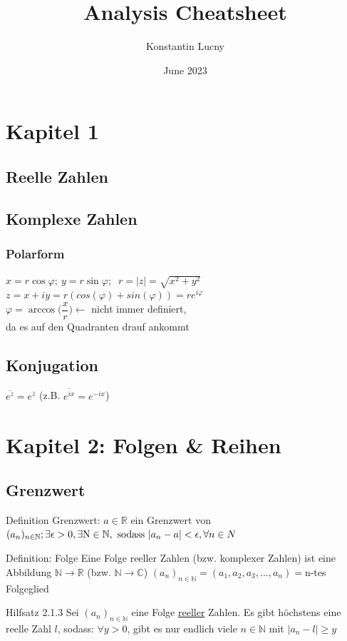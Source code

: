\documentclass[a4paper,10pt]{article}
\title{Analysis Cheatsheet}
\author{Konstantin Lucny}
\date{June 2023}
\def\R{\mathbb{R}}
\begin{document}
\maketitle



\section{Kapitel 1}
\subsection{Reelle Zahlen}

\subsection{Komplexe Zahlen}
\subsubsection{Polarform}
$ x = r\cos {\varphi};\ y=r\sin{\varphi};\  $ $r=|z|=\sqrt{x^2+y^2}$\\
$z=x+iy=r(cos(\varphi)+sin(\varphi))=re^{i\varphi} $\\
$\varphi=\arccos{\bigg(\dfrac{x}{r}\bigg)} \leftarrow$  nicht immer definiert,\\
da es auf den Quadranten drauf ankommt
\subsection{Konjugation}
$\overline{e^z}=e^{\overline{z}}$ (z.B. $\overline{e^{ix}}=e^{-ix}$)


\section{Kapitel 2: Folgen \& Reihen}
\subsection{Grenzwert}
\begin {defbox}{Definition Grenzwert: } $a \in \R $ ein Grenzwert von $(a_n)_{n\in \mathbb{N}};\\ \exists \epsilon > 0, \exists \text{N} \in \mathbb{N}, \text{ sodass } |a_n-a|<\epsilon, \forall n \in N $ 
\end {defbox}
\begin{defbox}{Definition: Folge} Eine Folge reeller Zahlen (bzw. komplexer Zahlen) ist eine Abbildung $\mathbb{N} \longrightarrow \mathbb{R} $ (bzw. $\mathbb{N}\longrightarrow\mathbb{C}$)
$(a_n)_{n\in \mathbb{N}}=(a_1,a_2,a_3,...,a_n)=$n-tes Folgeglied
\end{defbox}
\begin{tbox}{Hilfsatz 2.1.3}
Sei $(a_n)_{n\in\mathbb{N}}$ eine Folge \underline{reeller} Zahlen. Es gibt höchstens eine reelle Zahl $l$, sodass: $\forall y>0$, gibt es nur endlich viele $n\in \mathbb{N}$ mit $|a_n-l|\ge y$
\end{tbox}
\end{document}
